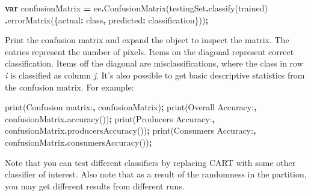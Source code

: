 \documentclass[
]{article}
\newenvironment{Shaded}{\begin{snugshade}}{\end{snugshade}}
\newcommand{\DataTypeTok}[1]{\textcolor[rgb]{0.13,0.29,0.53}{#1}}
\newcommand{\FunctionTok}[1]{\textcolor[rgb]{0.00,0.00,0.00}{#1}}
\newcommand{\KeywordTok}[1]{\textcolor[rgb]{0.13,0.29,0.53}{\textbf{#1}}}
\newcommand{\NormalTok}[1]{#1}
\newcommand{\OperatorTok}[1]{\textcolor[rgb]{0.81,0.36,0.00}{\textbf{#1}}}
\newcommand{\StringTok}[1]{\textcolor[rgb]{0.31,0.60,0.02}{#1}}
\begin{document}
\begin{Shaded}
\begin{Highlighting}[]
\KeywordTok{var}\NormalTok{ confusionMatrix }\OperatorTok{=}\NormalTok{  ee}\OperatorTok{.}\FunctionTok{ConfusionMatrix}\NormalTok{(testingSet}\OperatorTok{.}\FunctionTok{classify}\NormalTok{(trained)}
                                          \OperatorTok{.}\FunctionTok{errorMatrix}\NormalTok{(\{}\DataTypeTok{actual}\OperatorTok{:} \StringTok{\textquotesingle{}class\textquotesingle{}}\OperatorTok{,}
                                                        \DataTypeTok{predicted}\OperatorTok{:} \StringTok{\textquotesingle{}classification\textquotesingle{}}\NormalTok{\}))}\OperatorTok{;}  
\end{Highlighting}
\end{Shaded}

Print the confusion matrix and expand the object to inspect the matrix. The entries represent the number of pixels. Items on the diagonal represent correct classification. Items off the diagonal are misclassifications, where the class in row \emph{i} is classified as column \emph{j}. It's also possible to get basic descriptive statistics from the confusion matrix. For example:

\begin{Shaded}
\begin{Highlighting}[]
\FunctionTok{print}\NormalTok{(}\StringTok{\textquotesingle{}Confusion matrix:\textquotesingle{}}\OperatorTok{,}\NormalTok{ confusionMatrix)}\OperatorTok{;}
\FunctionTok{print}\NormalTok{(}\StringTok{\textquotesingle{}Overall Accuracy:\textquotesingle{}}\OperatorTok{,}\NormalTok{ confusionMatrix}\OperatorTok{.}\FunctionTok{accuracy}\NormalTok{())}\OperatorTok{;}
\FunctionTok{print}\NormalTok{(}\StringTok{\textquotesingle{}Producers Accuracy:\textquotesingle{}}\OperatorTok{,}\NormalTok{ confusionMatrix}\OperatorTok{.}\FunctionTok{producersAccuracy}\NormalTok{())}\OperatorTok{;}
\FunctionTok{print}\NormalTok{(}\StringTok{\textquotesingle{}Consumers Accuracy:\textquotesingle{}}\OperatorTok{,}\NormalTok{ confusionMatrix}\OperatorTok{.}\FunctionTok{consumersAccuracy}\NormalTok{())}\OperatorTok{;}  
\end{Highlighting}
\end{Shaded}

Note that you can test different classifiers by replacing CART with some other classifier of interest. Also note that as a result of the randomness in the partition, you may get different results from different runs.
\end{document}
